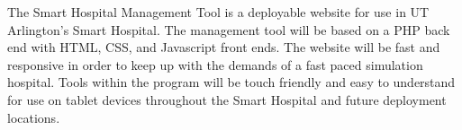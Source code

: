 The Smart Hospital Management Tool is a deployable website for use in UT Arlington's Smart Hospital. The management tool will be based on a PHP back end with HTML, CSS, and Javascript front ends. The website will be fast and responsive in order to keep up with the demands of a fast paced simulation hospital. Tools within the program will be touch friendly and easy to understand for use on tablet devices throughout the Smart Hospital and future deployment locations.